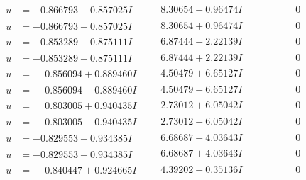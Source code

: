 \documentclass[1p]{elsarticle_modified}
\theoremstyle{definition}
\begin{document}
$$\begin{array}{c|c|c}
\begin{aligned}
u &= -0.866793 + 0.857025 I\end{aligned}
 & \phantom{-}8.30654 - 0.96474 I & \phantom{-0.000000 } 0 \\ \hline\begin{aligned}
u &= -0.866793 - 0.857025 I\end{aligned}
 & \phantom{-}8.30654 + 0.96474 I & \phantom{-0.000000 } 0 \\ \hline\begin{aligned}
u &= -0.853289 + 0.875111 I\end{aligned}
 & \phantom{-}6.87444 - 2.22139 I & \phantom{-0.000000 } 0 \\ \hline\begin{aligned}
u &= -0.853289 - 0.875111 I\end{aligned}
 & \phantom{-}6.87444 + 2.22139 I & \phantom{-0.000000 } 0 \\ \hline\begin{aligned}
u &= \phantom{-}0.856094 + 0.889460 I\end{aligned}
 & \phantom{-}4.50479 + 6.65127 I & \phantom{-0.000000 } 0 \\ \hline\begin{aligned}
u &= \phantom{-}0.856094 - 0.889460 I\end{aligned}
 & \phantom{-}4.50479 - 6.65127 I & \phantom{-0.000000 } 0 \\ \hline\begin{aligned}
u &= \phantom{-}0.803005 + 0.940435 I\end{aligned}
 & \phantom{-}2.73012 + 6.05042 I & \phantom{-0.000000 } 0 \\ \hline\begin{aligned}
u &= \phantom{-}0.803005 - 0.940435 I\end{aligned}
 & \phantom{-}2.73012 - 6.05042 I & \phantom{-0.000000 } 0 \\ \hline\begin{aligned}
u &= -0.829553 + 0.934385 I\end{aligned}
 & \phantom{-}6.68687 - 4.03643 I & \phantom{-0.000000 } 0 \\ \hline\begin{aligned}
u &= -0.829553 - 0.934385 I\end{aligned}
 & \phantom{-}6.68687 + 4.03643 I & \phantom{-0.000000 } 0 \\ \hline\begin{aligned}
u &= \phantom{-}0.840447 + 0.924665 I\end{aligned}
 & \phantom{-}4.39202 - 0.35136 I & \phantom{-0.000000 } 0 \\ \hline\begin{aligned}

\end{aligned}
\end{array}$$
\end{document}
